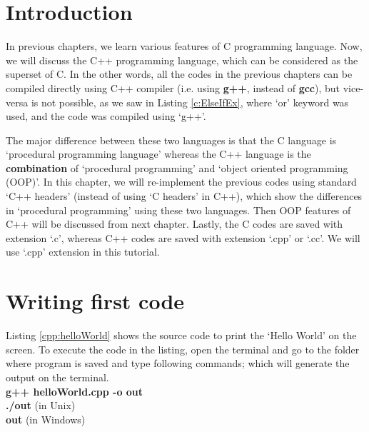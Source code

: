 \section{Introduction}

In previous chapters, we learn various features of C programming language. Now, we will discuss the C++ programming language, which can be considered as the superset of C. In the other words, all the codes in the previous chapters can be compiled directly using C++ compiler (i.e. using \textbf{g++}, instead of \textbf{gcc}), but vice-versa is not possible, as we saw in Listing \ref{c:ElseIfEx}, where `or' keyword was used, and the code was compiled using `g++'. 

The major difference between these two languages is that the C language is `procedural programming language' whereas the C++ language is the \textbf{combination} of `procedural programming' and `object oriented programming (OOP)'. In this chapter, we will re-implement the previous codes using standard `C++ headers' (instead of using `C headers' in C++), which show the differences in `procedural programming' using these two languages. Then OOP features of C++ will be discussed from next chapter.  Lastly, the C codes are saved with extension `.c', whereas C++ codes are saved with extension `.cpp' or `.cc'. We will use `.cpp' extension in this tutorial. 

\section{Writing first code}
Listing \ref{cpp:helloWorld} shows the source code to print the `Hello World' on the screen. To execute the code in the listing, open the terminal and go to the folder where program is saved and type following commands; which will generate the output on the terminal. 
\\
\textbf{\textdollar { \ } g++ helloWorld.cpp -o out} \\
\textbf{\textdollar { \ }  ./out} (in Unix)\\
\textbf{\textdollar { \ }  out} (in Windows)

